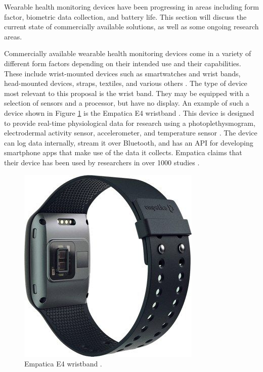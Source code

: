 Wearable health monitoring devices have been progressing in areas including
form factor, biometric data collection, and battery life.  This section will
discuss the current state of commercially available solutions, as well as some
ongoing research areas.

Commercially available wearable health monitoring devices come in a variety of
different form factors depending on their intended use and their capabilities.
These include wrist-mounted devices such as smartwatches and wrist bands,
head-mounted devices, straps, textiles, and various
others \cite{Seneviratne2017}.  The type of device most relevant to this
proposal is the wrist band.  They may be equipped with a selection of sensors
and a processor, but have no display.  An example of such a device shown in 
Figure \ref{fig:EmpaticaE4} is the Empatica E4 wristband \cite{McCarthy2016}.  
This device is designed to provide real-time
physiological data for research using a photoplethysmogram, electrodermal
activity sensor, accelerometer, and temperature sensor \cite{empatica}. The
device can log data internally, stream it over Bluetooth, and has an API for
developing smartphone apps that make use of the data it collects. Empatica
claims that their device has been used by researchers in over 1000 studies
\cite{empatica}.

\begin{figure}[!htb]
\centering
\includegraphics[scale = 0.5]{images/EmpaticaE4.jpg}
\caption{Empatica E4 wristband \cite{empatica}.}
\label{fig:EmpaticaE4}
\end{figure}

